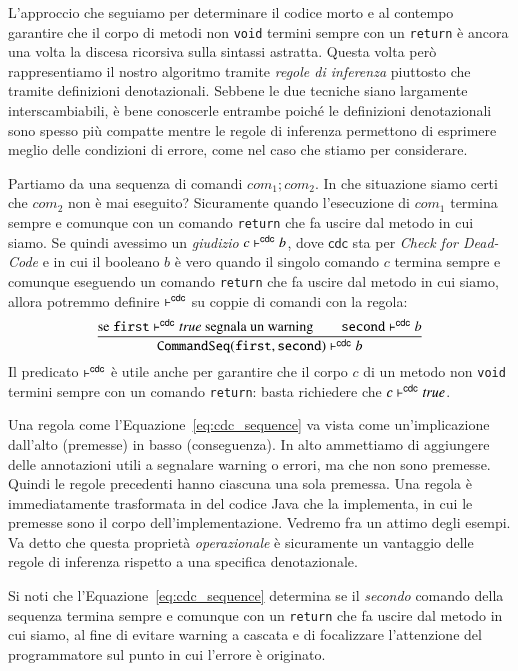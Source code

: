 L'approccio che seguiamo per determinare il codice morto e al contempo
garantire che il corpo di metodi non \texttt{void} termini sempre con
un \texttt{return} \`e ancora una
volta la discesa ricorsiva sulla sintassi astratta. Questa volta per\`o
rappresentiamo il nostro algoritmo tramite \emph{regole di inferenza}
piuttosto che tramite definizioni denotazionali. Sebbene le due tecniche siano
largamente interscambiabili, \`e bene conoscerle entrambe poich\'e
le definizioni denotazionali sono spesso pi\`u compatte mentre le regole
di inferenza permettono di esprimere meglio delle condizioni di errore,
come nel caso che stiamo per considerare.

Partiamo da una sequenza di comandi $\mathit{com}_1;\mathit{com}_2$.
In che situazione siamo certi che $\mathit{com}_2$ non \`e mai eseguito?
Sicuramente quando l'esecuzione di $\mathit{com}_1$ termina sempre e
comunque con un comando \texttt{return} che fa uscire dal metodo
in cui siamo. Se quindi avessimo un
\emph{giudizio} $c\vdash^{\mathsf{cdc}} b$, dove $\mathsf{cdc}$ sta per
\emph{Check for Dead-Code} e in cui il booleano $b$ \`e vero quando il singolo
comando $c$ termina sempre e comunque eseguendo un comando \texttt{return} che
fa uscire dal metodo in cui siamo,
allora potremmo definire $\vdash^{\mathsf{cdc}}$ su coppie di comandi con la regola:
%
\begin{equation}\label{eq:cdc_sequence}
  \frac{\text{se }\mathtt{first}\vdash^{\mathsf{cdc}}\mathit{true}\text{ segnala un warning}
    \qquad\mathtt{second}\vdash^{\mathsf{cdc}} b}{\mathtt{CommandSeq(first,second)}\vdash^{\mathsf{cdc}} b}
\end{equation}
%
Il predicato $\vdash^{\mathsf{cdc}}$ \`e utile anche per garantire che il corpo
$c$ di un metodo non \texttt{void} termini sempre con un comando
\texttt{return}: basta richiedere che $c\vdash^{\mathsf{cdc}}\mathit{true}$.

Una regola come l'Equazione~\eqref{eq:cdc_sequence}
va vista come un'implicazione dall'alto (premesse) in basso
(conseguenza). In alto ammettiamo di aggiungere delle annotazioni utili
a segnalare warning o errori, ma che non sono premesse. Quindi le regole
precedenti hanno ciascuna una sola premessa. Una regola \`e immediatamente
trasformata in del codice Java che la implementa, in cui le premesse sono
il corpo dell'implementazione. Vedremo fra un attimo degli esempi.
Va detto che questa propriet\`a \emph{operazionale} \`e sicuramente un
vantaggio delle regole di inferenza rispetto a una specifica denotazionale.

Si noti che l'Equazione~\eqref{eq:cdc_sequence} determina se
il \emph{secondo} comando della sequenza termina sempre e comunque con un
\texttt{return} che fa uscire dal metodo in cui siamo,
al fine di evitare warning a cascata e di focalizzare
l'attenzione del programmatore sul punto in cui l'errore \`e originato.

